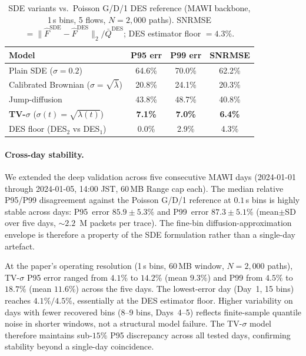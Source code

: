 \documentclass[pdflatex,sn-mathphys-num]{sn-jnl}
\theoremstyle{thmstyleone}%
\theoremstyle{thmstyletwo}%
\theoremstyle{thmstylethree}%
\begin{document}
\begin{table}[!t]
\caption{SDE variants vs.\ Poisson G/D/1 DES reference (MAWI backbone, 1\,s bins, 5 flows,
$N=2{,}000$ paths). SNRMSE $= \|\hat{F}^{\mathrm{SDE}}-\hat{F}^{\mathrm{DES}}\|_2 /
\bar{Q}^{\mathrm{DES}}$; DES estimator floor $= 4.3\%$.}
\label{tab:sde_des_comparison}
\centering
\begin{tabular}{@{}l c c c@{}}
\toprule
Model & P95 err & P99 err & SNRMSE \\
\midrule
Plain SDE ($\sigma=0.2$)                            & 64.6\% & 70.0\% & 62.2\% \\
Calibrated Brownian ($\sigma=\!\sqrt{\bar\lambda}$) & 20.8\% & 24.1\% & 20.3\% \\
Jump-diffusion                                      & 43.8\% & 48.7\% & 40.8\% \\
\textbf{TV-$\sigma$} ($\sigma(t)=\!\sqrt{\lambda(t)}$) & \textbf{7.1\%} & \textbf{7.0\%} & \textbf{6.4\%} \\
\midrule
DES floor (DES$_2$ vs DES$_1$)                      & 0.0\%  & 2.9\%  & 4.3\% \\
\bottomrule
\end{tabular}
\end{table}

\paragraph{Cross-day stability.}
We extended the deep validation across five consecutive MAWI days (2024-01-01 through 2024-01-05,
14:00 JST, 60\,MB Range cap each). The median relative P95/P99 disagreement against the Poisson
G/D/1 reference at $0.1$\,s bins is highly stable across days: P95~error $85.9\!\pm\!5.3\%$ and
P99~error $87.3\!\pm\!5.1\%$ (mean$\pm$SD over five days, $\sim\!2.2$~M packets per trace). The
fine-bin diffusion-approximation envelope is therefore a property of the SDE formulation rather
than a single-day artefact.

At the paper's operating resolution (1\,s bins, 60\,MB window, $N{=}2{,}000$ paths),
TV-$\sigma$ P95 error ranged from $4.1\%$ to $14.2\%$ (mean $9.3\%$) and P99 from $4.5\%$ to
$18.7\%$ (mean $11.6\%$) across the five days. The lowest-error day (Day~1, 15 bins) reaches
$4.1\%/4.5\%$, essentially at the DES estimator floor. Higher variability on days with fewer
recovered bins (8--9 bins, Days~4--5) reflects finite-sample quantile noise in shorter windows,
not a structural model failure. The TV-$\sigma$ model therefore maintains sub-$15\%$ P95
discrepancy across all tested days, confirming stability beyond a single-day coincidence.
\end{document}
